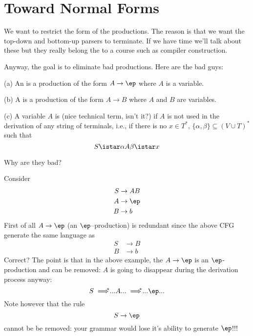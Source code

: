 \section{Toward Normal Forms}

We want to restrict the form of the productions. The reason is
that we want the top-down and bottom-up parsers  to terminate. If
we have time we'll talk about these but they really belong the to
a course such as compiler construction.

Anyway, the goal is to eliminate bad productions. 
Here are the bad
guys:

\begin{defn}
 \begin{mylist}
  \item[(a)] An  is a production of the form $A
  \rightarrow \ep$ where $A$ is a variable.
  \item[(b)] A  is a production of the form $A
  \rightarrow B$ where $A$ and $B$ are variables.
  \item[(c)] A variable $A$ is  (nice technical term,
  isn't it?) if $A$ is not used in the derivation of any string of
  terminals, i.e., if there is no $x \in T^*$, $\{ \alpha,\beta \}
  \subseteq (V \cup T)^*$ such that
  \[
   S \istar \alpha A \beta \istar x
  \]
 \end{mylist}
\end{defn}

Why are they bad?

\begin{eg}
Consider 
\begin{align*}
S &\rightarrow AB \\
A &\rightarrow \ep \\
B & \rightarrow b
\end{align*}
First of all $A \rightarrow \ep$ (an $\ep$--production) is redundant
since the above CFG generate the same language as
\begin{align*}
S &\rightarrow B \\
B &\rightarrow b
\end{align*}
Correct?
The point is that in the above example,
the $A \rightarrow \ep$ is an $\ep$-production and 
can be removed: $A$ is going to disappear during the derivation process
anyway:
\[
S 
\implies^{\hspace{-0.3cm}*} ... A ... 
\implies^{\hspace{-0.3cm}*} ... \ep ... 
\]
Note however that the rule
\[
S \rightarrow \ep
\]
cannot be be removed: your grammar would lose it's
ability to generate $\ep$!!!
\end{eg}

